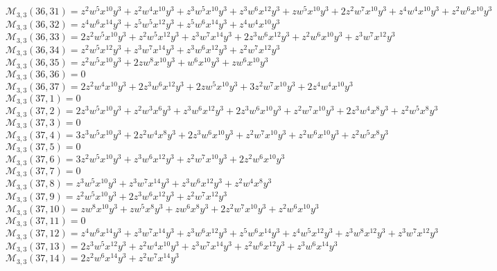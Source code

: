 $\mathcal{M}_{3,3}(36,31)=z^2w^5x^{10}y^3+z^2w^4x^{10}y^3+z^3w^5x^{10}y^3+z^3w^6x^{12}y^3+zw^5x^{10}y^3+2z^2w^7x^{10}y^3+z^4w^4x^{10}y^3+z^2w^6x^{10}y^3$\\
$\mathcal{M}_{3,3}(36,32)=z^4w^6x^{14}y^3+z^5w^5x^{12}y^3+z^5w^6x^{14}y^3+z^4w^4x^{10}y^3$\\
$\mathcal{M}_{3,3}(36,33)=2z^2w^5x^{10}y^3+z^2w^5x^{12}y^3+z^3w^7x^{14}y^3+2z^3w^6x^{12}y^3+z^2w^6x^{10}y^3+z^3w^7x^{12}y^3$\\
$\mathcal{M}_{3,3}(36,34)=z^2w^5x^{12}y^3+z^3w^7x^{14}y^3+z^3w^6x^{12}y^3+z^2w^7x^{12}y^3$\\
$\mathcal{M}_{3,3}(36,35)=z^2w^5x^{10}y^3+2zw^8x^{10}y^3+w^6x^{10}y^3+zw^6x^{10}y^3$\\
$\mathcal{M}_{3,3}(36,36)=0$\\
$\mathcal{M}_{3,3}(36,37)=2z^2w^4x^{10}y^3+2z^3w^6x^{12}y^3+2zw^5x^{10}y^3+3z^2w^7x^{10}y^3+2z^4w^4x^{10}y^3$\\
$\mathcal{M}_{3,3}(37,1)=0$\\
$\mathcal{M}_{3,3}(37,2)=2z^3w^5x^{10}y^3+z^2w^3x^6y^3+z^3w^6x^{12}y^3+2z^3w^6x^{10}y^3+z^2w^7x^{10}y^3+2z^3w^4x^8y^3+z^2w^5x^8y^3$\\
$\mathcal{M}_{3,3}(37,3)=0$\\
$\mathcal{M}_{3,3}(37,4)=3z^3w^5x^{10}y^3+2z^2w^4x^8y^3+2z^3w^6x^{10}y^3+z^2w^7x^{10}y^3+z^2w^6x^{10}y^3+z^2w^5x^8y^3$\\
$\mathcal{M}_{3,3}(37,5)=0$\\
$\mathcal{M}_{3,3}(37,6)=3z^2w^5x^{10}y^3+z^3w^6x^{12}y^3+z^2w^7x^{10}y^3+2z^2w^6x^{10}y^3$\\
$\mathcal{M}_{3,3}(37,7)=0$\\
$\mathcal{M}_{3,3}(37,8)=z^3w^5x^{10}y^3+z^3w^7x^{14}y^3+z^3w^6x^{12}y^3+z^2w^4x^8y^3$\\
$\mathcal{M}_{3,3}(37,9)=z^2w^5x^{10}y^3+2z^3w^6x^{12}y^3+z^2w^7x^{12}y^3$\\
$\mathcal{M}_{3,3}(37,10)=zw^8x^{10}y^3+zw^5x^8y^3+zw^6x^8y^3+2z^2w^7x^{10}y^3+z^2w^6x^{10}y^3$\\
$\mathcal{M}_{3,3}(37,11)=0$\\
$\mathcal{M}_{3,3}(37,12)=z^4w^6x^{14}y^3+z^3w^7x^{14}y^3+z^3w^6x^{12}y^3+z^5w^6x^{14}y^3+z^4w^5x^{12}y^3+z^3w^8x^{12}y^3+z^3w^7x^{12}y^3$\\
$\mathcal{M}_{3,3}(37,13)=2z^3w^5x^{12}y^3+z^2w^4x^{10}y^3+z^3w^7x^{14}y^3+z^2w^6x^{12}y^3+z^3w^6x^{14}y^3$\\
$\mathcal{M}_{3,3}(37,14)=2z^2w^6x^{14}y^3+z^2w^7x^{14}y^3$\\
